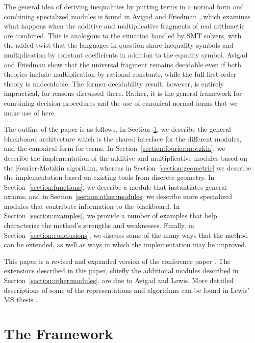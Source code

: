 \documentclass[runningheds]{llncs}
\begin{document}
The general idea of deriving inequalities by putting terms in a normal form and combining specialized modules is found in Avigad and Friedman \cite{avigad:friedman:06}, which examines what happens when the additive and multiplicative fragments of real arithmetic are combined. This is analogous to the situation handled by SMT solvers, with the added twist that the languages in question share inequality symbols and multiplication by constant coefficients in addition to the equality symbol. Avigad and Friedman show that the universal fragment remains decidable even if both theories include multiplication by rational constants, while the full first-order theory is undecidable. The former decidability result, however, is entirely impractical, for reasons discussed there. Rather, it is the general framework for combining decision procedures and the use of canonical normal forms that we make use of here.

The outline of the paper is as follows. In Section~\ref{section:framework}, we describe the general blackboard architecture which is the shared interface for the different modules, and the canonical form for terms. In Section~\ref{section:fourier:motzkin}, we describe the implementation of the additive and multiplicative modules based on the Fourier-Motzkin algorithm, whereas in Section~\ref{section:geometric} we describe the implementation based on existing tools from discrete geometry. In Section~\ref{section:functions}, we describe a module that instantiates general axioms, and in Section~\ref{section:other:modules} we describe more specialized modules that contribute information to the blackboard. In Section~\ref{section:examples}, we provide a number of examples that help characterize the method's strengths and weaknesses. Finally, in Section~\ref{section:conclusions}, we discuss some of the many ways that the method can be extended, as well as ways in which the implementation may be improved.

This paper is a revised and expanded version of the conference paper \cite{avigad:lewis:roux:14}. The extensions described in this paper, chiefly the additional modules described in Section~\ref{section:other:modules}, are due to Avigad and Lewis. More detailed descriptions of some of the representations and algorithms can be found in Lewis' MS thesis \cite{lewis:14}.


\section{The Framework}
\label{section:framework}
\end{document}
